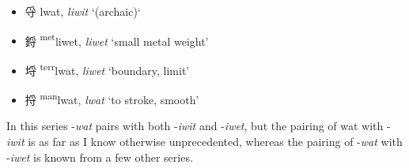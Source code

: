 \begin{itemize}
  \item {\Large{寽}} %
    {\large{lwat}},
    \textit{liwit} `(archaic)` %

  \item {\Large{鋝}} %
    {\large{{\textsuperscript{met}}liwet}},
    \textit{liwet} `small metal weight' %

  \item {\Large{埒}} %
    {\large{{\textsuperscript{terr}}lwat}},
    \textit{liwet} `boundary, limit' %

  \item {\Large{捋}} %
    {\large{{\textsuperscript{man}}lwat}},
    \textit{lwat} `to stroke, smooth' %
\end{itemize}

In this series -\textit{wat} pairs with both -\textit{iwit} and -\textit{iwet}, but the pairing of wat with -\textit{iwit} is as far as I know otherwise unprecedented, whereas the pairing of -\textit{wat} with -\textit{iwet} is known from a few other series. 

